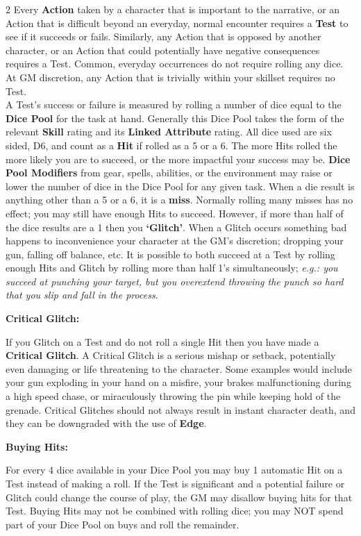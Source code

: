 \documentclass[
  oneside]{article}
\begin{document}
\begin{multicols}{2}
Every \textbf{Action} taken by a character that is
important to the narrative, or an Action that is
difficult beyond an everyday, normal encounter
requires a \textbf{Test} to see if it succeeds or
fails. Similarly, any Action that is opposed by
another character, or an Action that could
potentially have negative consequences requires a
Test. Common, everyday occurrences do not require
rolling any dice. At GM discretion, any Action
that is trivially within your skillset requires no
Test.\\
A Test's success or failure is measured by rolling
a number of dice equal to the \textbf{Dice Pool}
for the task at hand. Generally this Dice Pool
takes the form of the relevant \textbf{Skill}
rating and its \textbf{Linked Attribute} rating.
All dice used are six sided, D6, and count as a
\textbf{Hit} if rolled as a 5 or a 6. The more
Hits rolled the more likely you are to succeed, or
the more impactful your success may be.
\textbf{Dice Pool Modifiers} from gear, spells,
abilities, or the environment may raise or lower
the number of dice in the Dice Pool for any given
task. When a die result is anything other than a 5
or a 6, it is a \textbf{miss}. Normally rolling
many misses has no effect; you may still have
enough Hits to succeed. However, if more than half
of the dice results are a 1 then you
\textbf{`Glitch'}. When a Glitch occurs something
bad happens to inconvenience your character at the
GM's discretion; dropping your gun, falling off
balance, etc. It is possible to both succeed at a
Test by rolling enough Hits and Glitch by rolling
more than half 1's simultaneously; \emph{e.g.: you
succeed at punching your target, but you
overextend throwing the punch so hard that you
slip and fall in the process}.

\textbf{Critical Glitch:}

If you Glitch on a Test and do not roll a single
Hit then you have made a \textbf{Critical Glitch}.
A Critical Glitch is a serious mishap or setback,
potentially even damaging or life threatening to
the character. Some examples would include your
gun exploding in your hand on a misfire, your
brakes malfunctioning during a high speed chase,
or miraculously throwing the pin while keeping
hold of the grenade. Critical Glitches should not
always result in instant character death, and they
can be downgraded with the use of \textbf{Edge}.

\textbf{Buying Hits:}

For every 4 dice available in your Dice Pool you
may buy 1 automatic Hit on a Test instead of
making a roll. If the Test is significant and a
potential failure or Glitch could change the
course of play, the GM may disallow buying hits
for that Test. Buying Hits may not be combined
with rolling dice; you may NOT spend part of your
Dice Pool on buys and roll the remainder.


\end{multicols}
\end{document}
